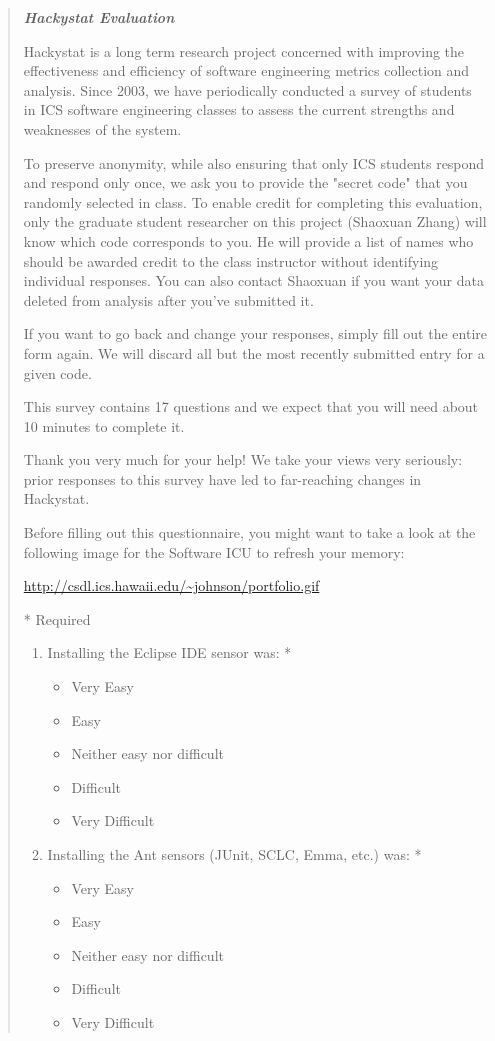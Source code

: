 \documentclass[11pt]{article}
\begin{document}
\begin{quote}
\sl
{\bf \em Hackystat Evaluation}

Hackystat is a long term research project concerned with improving the effectiveness and efficiency of software engineering metrics collection and analysis.  Since 2003, we have periodically conducted a survey of students in ICS software engineering classes to assess the current strengths and weaknesses of the system.

To preserve anonymity,  while also ensuring that only ICS students respond and respond only once, we ask you to provide the "secret code" that you randomly selected in class.   To enable credit for completing this evaluation, only the graduate student researcher on this project (Shaoxuan Zhang) will know which code corresponds to you.  He will provide a list of names who should be awarded credit to the class instructor without identifying individual responses.  You can also contact Shaoxuan if you want your data deleted from analysis after you've submitted it.

If you want to go back and change your responses, simply fill out the entire form again.  We will discard all but the most recently submitted entry for a given code.

This survey contains 17 questions and we expect that you will need about 10 minutes to complete it.

Thank you very much for your help!  We take your views very seriously: prior responses to this survey have led to far-reaching changes in Hackystat.

Before filling out this questionnaire, you might want to take a look at the following image for the Software ICU to refresh your memory:

\url{http://csdl.ics.hawaii.edu/~johnson/portfolio.gif}

* Required
\begin{enumerate}

\item Installing the Eclipse IDE sensor was: *
\begin{itemize}
\item Very Easy
\item Easy
\item Neither easy nor difficult
\item Difficult
\item Very Difficult
\end{itemize}

\item Installing the Ant sensors (JUnit, SCLC, Emma, etc.) was: *
\begin{itemize}
\item Very Easy
\item Easy
\item Neither easy nor difficult
\item Difficult
\item Very Difficult
\end{itemize}


\end{enumerate}
\end{quote}
\end{document}
